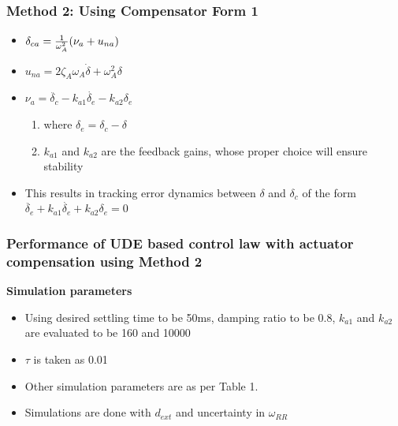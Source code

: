 \documentclass[table,10pt,red]{beamer}	%
\begin{document}
\begin{frame}
\frametitle{Method 2: Using Compensator Form 1}
\begin{itemize}

		\item $\delta_{ca}={{1}\over{\omega^2_A}}(\nu_a+u_{na})$
		\item $u_{na}=2\zeta_A\omega_A\dot{\delta}+\omega_A^2\delta$
		\item $\nu_a=\ddot{\delta_c}  -  k_{a1}\dot{\delta_e} - k_{a2}\delta_e$
		\begin{enumerate}
		\item where $\delta_e=\delta_c-\delta$
		\item $k_{a1}$ and $k_{a2}$ are the feedback gains, whose proper choice will ensure stability

\end{enumerate}
\item This results in tracking error dynamics between $\delta$ and $\delta_c$ of the form $\ddot{\delta_e}  +  k_{a1}\dot{\delta_e} + k_{a2}\delta_e=0$
\end{itemize}
\end{frame}
\begin{frame}
\frametitle{Performance of UDE based control law with actuator compensation using Method 2}
\textbf{Simulation parameters}
\begin{itemize}
\item Using desired settling time to be 50ms, damping ratio to be 0.8, $k_{a1}$ and $k_{a2}$ are evaluated to be 160 and 10000
\item $\tau$ is taken as 0.01 
\item Other simulation parameters are as per Table 1.
\item Simulations are done with $d_{ext}$ and uncertainty in $\omega_{RR}$
\end{itemize}

\end{frame}
\end{document}
